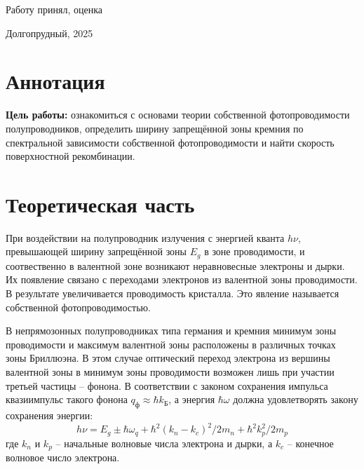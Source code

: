 \documentclass[a4paper, 12pt]{article}
\begin{document}
\begin{titlepage}
    \vspace{1em}

    \begin{flushleft}
        Работу принял, оценка
        \hspace{15em}
    \end{flushleft}

    \vspace{5em}
    
    \begin{center}
        Долгопрудный, 2025
    \end{center}
\end{titlepage}

\newpage
\tableofcontents

\newpage
\section{Аннотация}
\textbf{Цель работы:} ознакомиться с основами теории собственной фотопроводимости полупроводников, определить ширину запрещённой зоны кремния по спектральной зависимости собственной фотопроводимости и найти скорость поверхностной рекомбинации.

    
   

\section{Теоретическая часть}
При воздействии на полупроводник излучения с энергией кванта $h\nu$, превышающей ширину запрещённой зоны $E_g$ в зоне проводимости, и соотвественно в валентной зоне возникают неравновесные электроны и дырки. Их появление связано с переходами электронов из валентной зоны проводимости. В результате увеличивается проводимость кристалла. Это явление называется собственной фотопроводимостью.

В непрямозонных полупроводниках типа германия и кремния минимум зоны проводимости и максимум валентной зоны расположены в различных точках зоны Бриллюэна. В этом случае оптический переход электрона из вершины валентной зоны в минимум зоны проводимости возможен лишь при участии третьей частицы – фонона. В соответствии с законом сохранения импульса квазиимпульс такого фонона $q_{\text{ф}}\approx\hbar k_{\text{Б}}$, а энергия $\hbar\omega$ должна удовлетворять закону сохранения энергии:
    \begin{equation}
        h\nu = E_g\pm \hbar\omega_q+\hbar^2(k_n-k_c)^2/2m_n+\hbar^2k_p^2/2m_p
    \end{equation}
    где $k_n$ и $k_p$ -- начальные волновые числа электрона и дырки, а $k_c$ -- конечное волновое число электрона.
\end{document}
